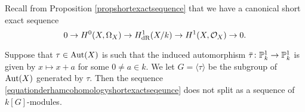     Recall from Proposition \ref{propshortexactsequence} that we have a canonical short exact sequence
        \begin{equation}\label{equationderhamcohomologyshortexactseqeunce}
        0 \rightarrow {H^0(X,\Omega_X)} \rightarrow H_{\text {dR}}^1(X/k) \rightarrow H^1(X,\mathcal{O}_X) \rightarrow 0.
        \end{equation}
        
    \begin{thm}
    Suppose that $\tau \in \operatorname{Aut}(X)$ is such that the induced automorphism $\bar \tau \colon \mathbb P_k^1 \rightarrow \mathbb P_k^1$ is given by $x \mapsto x+a$ for some $0 \neq a \in k$.
    We let $G = \langle \tau \rangle$ be the subgroup of $\operatorname{Aut}(X)$ generated by $\tau$.
    Then the sequence \eqref{equationderhamcohomologyshortexactseqeunce} does not split as a sequence of $k[G]$-modules.
    \end{thm}
